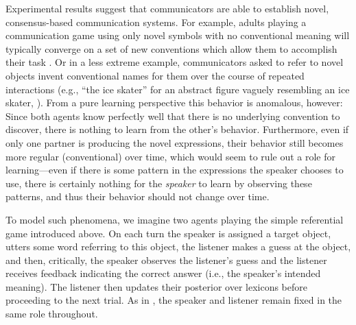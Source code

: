 \documentclass{article} %
\begin{document}
Experimental results suggest that communicators are able to establish
novel, consensus-based communication systems. For example, adults
playing a communication game using only novel symbols with no
conventional meaning will typically converge on a set of new
conventions which allow them to accomplish their task
\cite{galantucci2005}. Or in a less extreme example, communicators
asked to refer to novel objects invent conventional names for them
over the course of repeated interactions (e.g., ``the ice skater'' for
an abstract figure vaguely resembling an ice skater,
\cite{clark1986}). From a pure learning perspective this behavior is anomalous,
however: Since both agents know perfectly well that there is no
underlying convention to discover, there is nothing to learn from the
other's behavior. Furthermore, even if only one partner is producing
the novel expressions, their behavior still becomes more regular
(conventional) over time, which would seem to rule out a role for
learning---even if there is some pattern in the expressions the
speaker chooses to use, there is certainly nothing for the
\textit{speaker} to learn by observing these patterns, and thus their
behavior should not change over time.


To model such phenomena, we imagine two agents playing the simple
referential game introduced above. On each turn the speaker is
assigned a target object, utters some word referring to this object,
the listener makes a guess at the object, and then, critically, the
speaker observes the listener's guess and the listener receives
feedback indicating the correct answer (i.e., the speaker's intended
meaning). The listener then updates their posterior over lexicons
before proceeding to the next trial. As in
\cite{krauss1964,clark1986}, the speaker and listener remain fixed in
the same role throughout.
\end{document}
